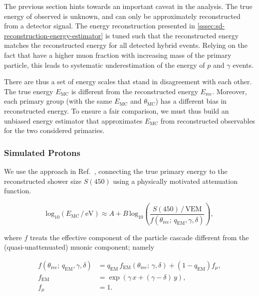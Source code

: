 The previous section hints towards an important caveat in the analysis. The true
energy of observed \CRs is unknown, and can only be approximately reconstructed 
from a detector signal. The energy reconstruction presented in 
\cref{sssec:sd-reconstruction-energy-estimator} is tuned such that the 
reconstructed \SD energy matches the reconstructed \FD energy for all detected
hybrid events. Relying on the fact that \EASs have a higher muon fraction with 
increasing mass of the primary particle, this leads to systematic 
underestimation of the energy of $p$ and $\gamma$ events.

There are thus a set of energy scales that stand in disagreement with each 
other. The true \CR energy $E_\mathrm{MC}$ is different from the reconstructed
energy $E_\mathrm{rec}$. Moreover, each primary group (with the same 
$E_\mathrm{MC}$ and $\theta_\mathrm{MC}$) has a different bias in reconstructed
energy. To ensure a fair comparison, we must thus build an unbiased energy 
estimator that approximates $E_\mathrm{MC}$ from reconstructed observables for 
the two considered primaries.

\subsubsection{Simulated Protons}
\label{sssec:proton-energy-scale}

We use the approach in Ref.~\cite{ellwangerAttenuationModelsExtensive2025}, 
connecting the true primary energy to the reconstructed shower size $S(450)$
using a physically motivated attenuation function.

\begin{equation}
\label{eq:proton-energy-scale}
\mathrm{log}_{10}\left(E_\mathrm{MC}\,/\,\mathrm{eV}\right) \approx A + B\,\mathrm{log}_{10}\left(\frac{S(450)\,/\,\mathrm{VEM}}{f(\theta_\mathrm{rec};\,q_\mathrm{EM}, \gamma, \delta)}\right),
\end{equation}

where $f$ treats the effective \EM component of the particle cascade different 
from the (quasi-unattenuated) muonic component; namely

\begin{align}
\label{eq:physically-motivated-attenuation-function}
f(\theta_\mathrm{rec};\,q_\mathrm{EM}, \gamma, \delta) &= q_\mathrm{EM}\,f_\mathrm{EM}(\theta_\mathrm{rec};\,\gamma, \delta) + (1-q_\mathrm{EM}) f_\mu, \\ 
\label{eq:electromagnetic-attenuation-function}
f_\mathrm{EM} &= \exp\left(\gamma\,x + (\gamma - \delta)\,y\right), \\
f_\mu &= 1.
\end{align}

